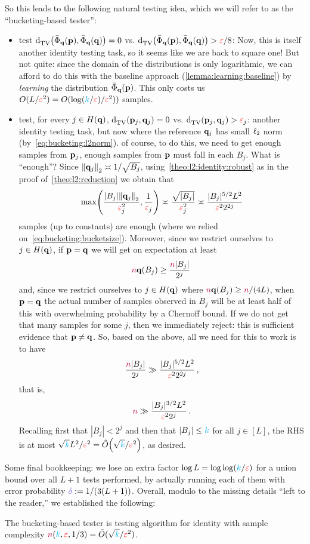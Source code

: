 \noindent So this leads to the following natural testing idea, which we will refer to as the ``bucketing-based tester'':
 \begin{itemize}
 	\item test $\totalvardist{\bar{\Phi}_\q(\p)}{\bar{\Phi}_\q(\q)} = 0$ vs. $\totalvardist{\bar{\Phi}_\q(\p)}{\bar{\Phi}_\q(\q)}>\dst/8$: Now, this is itself another identity testing task, so it seems like we are back to square one! But not quite: since the domain of the distributions is only logarithmic, we can afford to do this with the baseline approach (\cref{lemma:learning:baseline}) by \emph{learning} the distribution $\bar{\Phi}_\q(\p)$. This only costs us $O(L/\dst^2) = O(\log(\ab/\dst)/\dst^2))$ samples.
 	\item test, for every $j\in H(\q)$, $\totalvardist{\p_j}{\q_j} = 0$ vs. $\totalvardist{\p_j}{\q_j}>\dst_j$: another identity testing task, but now where the reference $\q_j$ has small $\lp[2]$ norm (by~\cref{eq:bucketing:l2norm}). of course, to do this, we need to get enough samples from $\p_j$, \ie enough samples from $\p$ must fall in each $B_j$. What is ``enough''? Since $\normtwo{\q_j}\asymp 1/\sqrt{B_j}$, using~\cref{theo:l2:identity:robust} as in the proof of~\cref{theo:l2:reduction} we obtain that
 	\[
 			\max\Paren{\frac{|B_j|\normtwo{\q_j}}{\dst_j^2}, \frac{1}{\dst_j}} \asymp \frac{\sqrt{|B_j|}}{\dst_j^2} \asymp \frac{|B_j|^{5/2}L^2}{\dst^22^{2j}}
 	\]
 	samples (up to constants) are enough (where we relied on~\cref{eq:bucketing:bucketsize}). Moreover, since we restrict ourselves to $j\in H(\q)$, if $\p=\q$ we will get on expectation at least
 	\[
 		\ns\q(B_j) \geq \frac{\ns|B_j|}{2^j}\;
 	\]
 	and, since we restrict ourselves to $j\in H(\q)$ where $\ns\q(B_j)\geq \ns/(4L)$, when $\p=\q$ the actual number of samples observed in $B_j$ will be at least half of this with overwhelming probability by a Chernoff bound. If we do not get that many samples for some $j$, then we immediately reject: this is sufficient evidence that $\p\neq \q$. So, based on the above, all we need for this to work is to have
 	\[
 		\frac{\ns|B_j|}{2^j} \gg \frac{|B_j|^{5/2}L^2}{\dst^22^{2j}}\,,
 	\]
 	that is,
 	\[
 		\ns \gg \frac{|B_j|^{3/2}L^2}{\dst^22^j}\,.
 	\]
 	Recalling first that $|B_j|<2^j$ and then that $|B_j|\leq \ab$ for all $j\in[L]$, the RHS is at most $\sqrt{\ab}L^2/\dst^2 = \tildeO{\sqrt{\ab}/\dst^2}$, as desired.
 \end{itemize}
Some final bookkeeping: we lose an extra factor $\log L = \log\log(\ab/\dst)$ for a union bound over all $L+1$ tests performed, by actually running each of them with error probability $\errprob \eqdef 1/(3(L+1))$. Overall, modulo to the missing details ``left to the reader,'' we established the following:
\begin{theorem}
  \label{theo:bucketing}
The bucketing-based tester is testing algorithm for identity with sample complexity $\ns(\ab,\dst,1/3) = \tilde{O}(\sqrt{\ab}/\dst^2)$.
\end{theorem}


